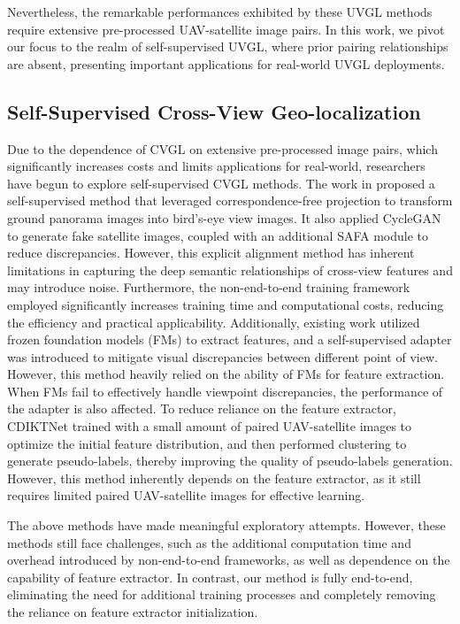 Nevertheless, the remarkable performances exhibited by these UVGL methods require extensive pre-processed UAV-satellite image pairs. In this work, we pivot our focus to the realm of self-supervised UVGL, where prior pairing relationships are absent, presenting important applications for real-world UVGL deployments.

\subsection{Self-Supervised Cross-View Geo-localization}
Due to the dependence of CVGL on extensive pre-processed image pairs, which significantly increases costs and limits applications for real-world, researchers have begun to explore self-supervised CVGL methods. The work in \cite{Li_2024_CVPR} proposed a self-supervised method that leveraged correspondence-free projection to transform ground panorama images into bird’s-eye view images. It also applied CycleGAN \cite{Zhu_2017_ICCV} to generate fake satellite images, coupled with an additional SAFA module \cite{shi2019spatial} to reduce discrepancies. However, this explicit alignment method has inherent limitations in capturing the deep semantic relationships of cross-view features and may introduce noise. Furthermore, the non-end-to-end training framework employed significantly increases training time and computational costs, reducing the efficiency and practical applicability. Additionally, existing work \cite{li2024learning} utilized frozen foundation models (FMs) \cite{oquab2023dinov2,radford2021learning} to extract features, and a self-supervised adapter was introduced to mitigate visual discrepancies between different point of view. However, this method heavily relied on the ability of FMs for feature extraction. When FMs fail to effectively handle viewpoint discrepancies, the performance of the adapter is also affected. To reduce reliance on the feature extractor, CDIKTNet \cite{chen2025limited} trained with a small amount of paired UAV-satellite images to optimize the initial feature distribution, and then performed clustering to generate pseudo-labels, thereby improving the quality of pseudo-labels generation. However, this method inherently depends on the feature extractor, as it still requires limited paired UAV-satellite images for effective learning. 

The above methods have made meaningful exploratory attempts. However, these methods still face challenges, such as the additional computation time and overhead introduced by non-end-to-end frameworks, as well as dependence on the capability of feature extractor. In contrast, our method is fully end-to-end, eliminating the need for additional training processes and completely removing the reliance on feature extractor initialization.

